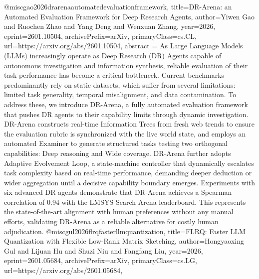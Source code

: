 {}@misc{gao2026drarenaautomatedevaluationframework,
      title={DR-Arena: an Automated Evaluation Framework for Deep Research Agents}, 
      author={Yiwen Gao and Ruochen Zhao and Yang Deng and Wenxuan Zhang},
      year={2026},
      eprint={2601.10504},
      archivePrefix={arXiv},
      primaryClass={cs.CL},
      url={https://arxiv.org/abs/2601.10504},
      abstract = {As Large Language Models (LLMs) increasingly operate as Deep Research (DR) Agents capable of autonomous investigation and information synthesis, reliable evaluation of their task performance has become a critical bottleneck. Current benchmarks predominantly rely on static datasets, which suffer from several limitations: limited task generality, temporal misalignment, and data contamination. To address these, we introduce DR-Arena, a fully automated evaluation framework that pushes DR agents to their capability limits through dynamic investigation. DR-Arena constructs real-time Information Trees from fresh web trends to ensure the evaluation rubric is synchronized with the live world state, and employs an automated Examiner to generate structured tasks testing two orthogonal capabilities: Deep reasoning and Wide coverage. DR-Arena further adopts Adaptive Evolvement Loop, a state-machine controller that dynamically escalates task complexity based on real-time performance, demanding deeper deduction or wider aggregation until a decisive capability boundary emerges. Experiments with six advanced DR agents demonstrate that DR-Arena achieves a Spearman correlation of 0.94 with the LMSYS Search Arena leaderboard. This represents the state-of-the-art alignment with human preferences without any manual efforts, validating DR-Arena as a reliable alternative for costly human adjudication.}
}@misc{gul2026flrqfasterllmquantization,
      title={FLRQ: Faster LLM Quantization with Flexible Low-Rank Matrix Sketching}, 
      author={Hongyaoxing Gul and Lijuan Hu and Shuzi Niu and Fangfang Liu},
      year={2026},
      eprint={2601.05684},
      archivePrefix={arXiv},
      primaryClass={cs.LG},
      url={https://arxiv.org/abs/2601.05684},
}
